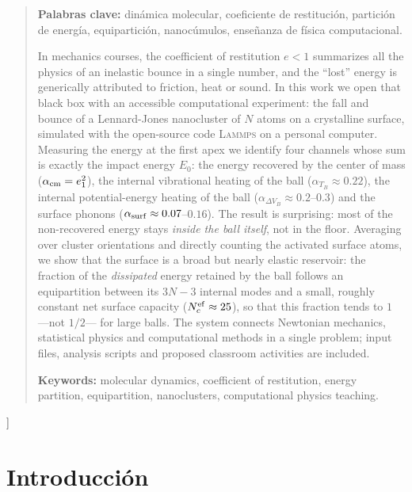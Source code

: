 \documentclass[10pt,a4paper,twocolumn]{article}
\newcommand{\lammps}{\textsc{Lammps}}
\begin{document}
{\begin{quotation}
\medskip
\noindent\textbf{Palabras clave:} dinámica molecular, coeficiente de
restitución, partición de energía, equipartición, nanocúmulos, enseñanza
de física computacional.

\bigskip
\noindent In mechanics courses, the coefficient of restitution $e<1$
summarizes all the physics of an inelastic bounce in a single number, and
the ``lost'' energy is generically attributed to friction, heat or sound.
In this work we open that black box with an accessible computational
experiment: the fall and bounce of a Lennard-Jones nanocluster of $N$
atoms on a crystalline surface, simulated with the open-source code
\lammps{} on a personal computer. Measuring the energy at the first apex
we identify four channels whose sum is exactly the impact energy $E_0$:
the energy recovered by the center of mass ($\alpha_{\rm cm}=e_1^2$), the
internal vibrational heating of the ball ($\alpha_{T_B}\approx0.22$), the
internal potential-energy heating of the ball ($\alpha_{\Delta V_B}\approx0.2$--$0.3$)
and the surface phonons ($\alpha_{\rm surf}\approx0.07$--$0.16$). The
result is surprising: most of the non-recovered energy stays \emph{inside
the ball itself}, not in the floor. Averaging over cluster orientations and
directly counting the activated surface atoms, we show that the surface is a
broad but nearly elastic reservoir: the fraction of the \emph{dissipated}
energy retained by the ball follows an equipartition between its $3N-3$
internal modes and a small, roughly constant net surface capacity
($N_c^{\rm ef}\approx25$), so that this fraction tends to $1$ ---not $1/2$---
for large balls. The system connects Newtonian mechanics, statistical physics
and computational methods in a single problem; input files, analysis scripts
and proposed classroom activities are included.

\medskip
\noindent\textbf{Keywords:} molecular dynamics, coefficient of
restitution, energy partition, equipartition, nanoclusters, computational
physics teaching.
\end{quotation}
\vspace{14pt}
}]

\section{Introducción}
\label{sec:intro}
\end{document}
